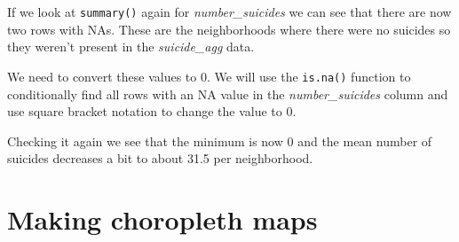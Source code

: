 \documentclass[
]{krantz}
\makeatletter
\newenvironment{Shaded}{\begin{snugshade}}{\end{snugshade}}
\newcommand{\CommentTok}[1]{\textcolor[rgb]{0.37,0.37,0.37}{\textit{#1}}}
\newcommand{\DecValTok}[1]{\textcolor[rgb]{0.06,0.06,0.06}{#1}}
\newcommand{\FunctionTok}[1]{\textcolor[rgb]{0,0,0}{#1}}
\newcommand{\NormalTok}[1]{#1}
\newcommand{\OtherTok}[1]{\textcolor[rgb]{0.37,0.37,0.37}{#1}}
\newcommand{\SpecialCharTok}[1]{\textcolor[rgb]{0,0,0}{#1}}
\newenvironment{kframe}{%
\medskip{}
\setlength{\fboxsep}{.8em}
 \def\at@end@of@kframe{}%
 \ifinner\ifhmode%
  \def\at@end@of@kframe{\end{minipage}}%
  \begin{minipage}{\columnwidth}%
 \fi\fi%
 \def\FrameCommand##1{\hskip\@totalleftmargin \hskip-\fboxsep
 \colorbox{shadecolor}{##1}\hskip-\fboxsep
     \hskip-\linewidth \hskip-\@totalleftmargin \hskip\columnwidth}%
 \MakeFramed {\advance\hsize-\width
   \@totalleftmargin\z@ \linewidth\hsize
   \@setminipage}}%
 {\par\unskip\endMakeFramed%
 \at@end@of@kframe}
\renewenvironment{Shaded}{\begin{kframe}}{\end{kframe}}
\makeatother
\begin{document}
If we look at \texttt{summary()} again for
\emph{number\_suicides} we can see that there are now two
rows with NAs. These are the neighborhoods where there were
no suicides so they weren't present in the
\emph{suicide\_agg} data.

\begin{Shaded}
\end{Shaded}

We need to convert these values to 0. We will use the
\texttt{is.na()} function to conditionally find all rows
with an NA value in the \emph{number\_suicides} column and
use square bracket notation to change the value to 0.

\begin{Shaded}
\end{Shaded}

Checking it again we see that the minimum is now 0 and the
mean number of suicides decreases a bit to about 31.5 per
neighborhood.

\begin{Shaded}
\end{Shaded}

\hypertarget{making-choropleth-maps}{%
\section{Making choropleth
maps}\label{making-choropleth-maps}}
\end{document}
